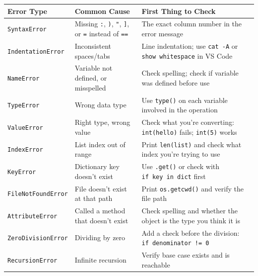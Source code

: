 \documentclass[
  justified,
  openright,
]{tufte-book}
\begin{document}
{\def\LTcaptype{none} %
\begin{longtable}[]{@{}
  >{\raggedright\arraybackslash}p{}
  >{\raggedright\arraybackslash}p{}
  >{\raggedright\arraybackslash}p{}@{}}
\toprule\noalign{}
\begin{minipage}[b]{\linewidth}\raggedright
Error Type
\end{minipage} & \begin{minipage}[b]{\linewidth}\raggedright
Common Cause
\end{minipage} & \begin{minipage}[b]{\linewidth}\raggedright
First Thing to Check
\end{minipage} \\
\midrule\noalign{}
\endhead
\bottomrule\noalign{}
\endlastfoot
\texttt{SyntaxError} & Missing \texttt{:}, \texttt{)}, \texttt{"},
\texttt{{]}}, or \texttt{=} instead of \texttt{==} & The exact column
number in the error message \\
\texttt{IndentationError} & Inconsistent spaces/tabs & Line indentation;
use \texttt{cat\ -A} or \texttt{show\ whitespace} in VS Code \\
\texttt{NameError} & Variable not defined, or misspelled & Check
spelling; check if variable was defined before use \\
\texttt{TypeError} & Wrong data type & Use \texttt{type()} on each
variable involved in the operation \\
\texttt{ValueError} & Right type, wrong value & Check what you're
converting: \texttt{int(\textquotesingle{}hello\textquotesingle{})}
fails; \texttt{int(\textquotesingle{}5\textquotesingle{})} works \\
\texttt{IndexError} & List index out of range & Print \texttt{len(list)}
and check what index you're trying to use \\
\texttt{KeyError} & Dictionary key doesn't exist & Use \texttt{.get()}
or check with \texttt{if\ key\ in\ dict} first \\
\texttt{FileNotFoundError} & File doesn't exist at that path & Print
\texttt{os.getcwd()} and verify the file path \\
\texttt{AttributeError} & Called a method that doesn't exist & Check
spelling and whether the object is the type you think it is \\
\texttt{ZeroDivisionError} & Dividing by zero & Add a check before the
division: \texttt{if\ denominator\ !=\ 0} \\
\texttt{RecursionError} & Infinite recursion & Verify base case exists
and is reachable \\
\end{longtable}
}
\end{document}
